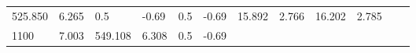 \documentclass{article}
\begin{document}
\begin{longtable}[]{@{}llllllllllll@{}}
\begin{minipage}[t]{0.06\columnwidth}
525.850\strut
\end{minipage} & \begin{minipage}[t]{0.08\columnwidth}\raggedright\strut
6.265\strut
\end{minipage} & \begin{minipage}[t]{0.03\columnwidth}\raggedright\strut
0.5\strut
\end{minipage} & \begin{minipage}[t]{0.06\columnwidth}\raggedright\strut
-0.69\strut
\end{minipage} & \begin{minipage}[t]{0.03\columnwidth}\raggedright\strut
0.5\strut
\end{minipage} & \begin{minipage}[t]{0.06\columnwidth}\raggedright\strut
-0.69\strut
\end{minipage} & \begin{minipage}[t]{0.06\columnwidth}\raggedright\strut
15.892\strut
\end{minipage} & \begin{minipage}[t]{0.08\columnwidth}\raggedright\strut
2.766\strut
\end{minipage} & \begin{minipage}[t]{0.06\columnwidth}\raggedright\strut
16.202\strut
\end{minipage} & \begin{minipage}[t]{0.09\columnwidth}\raggedright\strut
2.785\strut
\end{minipage}\tabularnewline
\begin{minipage}[t]{0.03\columnwidth}\raggedright\strut
1100\strut
\end{minipage} & \begin{minipage}[t]{0.06\columnwidth}\raggedright\strut
7.003\strut
\end{minipage} & \begin{minipage}[t]{0.06\columnwidth}\raggedright\strut
549.108\strut
\end{minipage} & \begin{minipage}[t]{0.08\columnwidth}\raggedright\strut
6.308\strut
\end{minipage} & \begin{minipage}[t]{0.03\columnwidth}\raggedright\strut
0.5\strut
\end{minipage} & \begin{minipage}[t]{0.06\columnwidth}\raggedright\strut
-0.69\strut
\end{minipage} & \begin{minipage}[t]{0.03\columnwidth}\raggedright\strut

\end{minipage}
\end{longtable}
\end{document}
